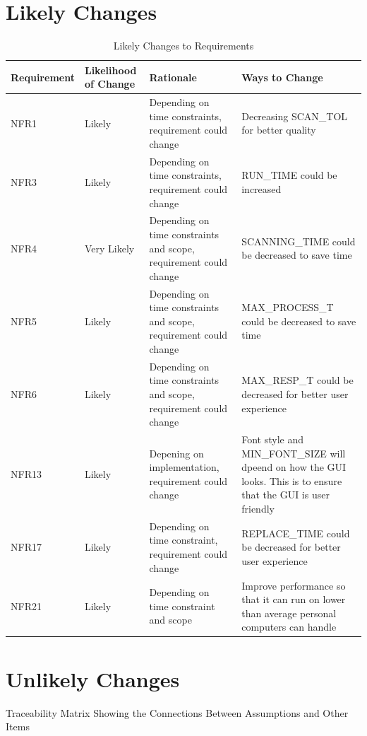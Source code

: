 \documentclass[12pt]{article}
\begin{document}
\section{Likely Changes}
\label{sec_LikelyChanges}

\begin{longtable}{ | p{2.5cm} | p{2.8cm} | p{4cm} | p{4cm} |}
\caption{Likely Changes to Requirements}
\label{Table:Likely}\\
\hline
{\bf Requirement} & {\bf Likelihood of Change} & {\bf Rationale} & {\bf Ways to Change} \\
\hline
NFR1 & Likely & Depending on time constraints, requirement could change & Decreasing SCAN\_TOL for better quality \\
\hline
NFR3 & Likely & Depending on time constraints, requirement could change & RUN\_TIME could be increased \\
\hline
NFR4 & Very Likely & Depending on time constraints and scope, requirement could change & SCANNING\_TIME could be decreased to save time \\
\hline
NFR5 & Likely & Depending on time constraints and scope, requirement could change & MAX\_PROCESS\_T could be decreased to save time \\
\hline
NFR6 & Likely & Depending on time constraints and scope, requirement could change & MAX\_RESP\_T could be decreased for better user experience \\
\hline
NFR13 & Likely & Depening on implementation, requirement could change & Font style and MIN\_FONT\_SIZE will dpeend on how the GUI looks. This is to ensure that the GUI is user friendly \\
\hline
NFR17 & Likely & Depending on time constraint, requirement could change & REPLACE\_TIME could be decreased for better user experience \\
\hline
NFR21 & Likely & Depending on time constraint and scope & Improve performance so that it can run on lower than average personal computers can handle \\
\hline
\end{longtable}

\section{Unlikely Changes} 
\label{sec_UnlikelyChanges}

Traceability Matrix Showing the Connections Between Assumptions and Other Items
\end{document}
